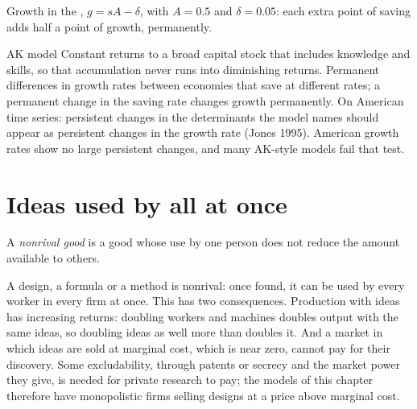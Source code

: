 \begin{omfigure}

{\small Growth in the , $g = sA - \delta$, with $A = 0.5$ and $\delta = 0.05$: each extra point of saving adds half a point of growth, permanently.}
\end{omfigure}

\begin{model}{AK model}
\assumes Constant returns to a broad capital stock that includes knowledge and skills, so that accumulation never runs
into diminishing returns.
\predicts Permanent differences in growth rates between economies that save at different rates; a permanent change in
the saving rate changes growth permanently.
\tested On American time series: persistent changes in the determinants the model names should appear as persistent
changes in the growth rate (Jones 1995).
\breaks American growth rates show no large persistent changes, and many AK-style models fail that test.
\end{model}

\section{Ideas used by all at once}\label{sec:b2:endogenous-growth:nonrival}

\begin{definition}\label{def:b2:endogenous-growth:nonrival}
A \emph{nonrival good} is a good whose use by one person does not reduce the amount available to
others.
\end{definition}

A design, a formula or a method is nonrival: once found, it can be used by every worker in every firm at once. This has
two consequences. Production with ideas has increasing returns: doubling workers and machines doubles output with the same
ideas, so doubling ideas as well more than doubles it. And a market in which ideas are sold at marginal cost, which is near
zero, cannot pay for their discovery. Some excludability, through patents or secrecy and the market power they give, is
needed for private research to pay; the models of this chapter therefore have monopolistic firms selling designs at a
price above marginal cost.

